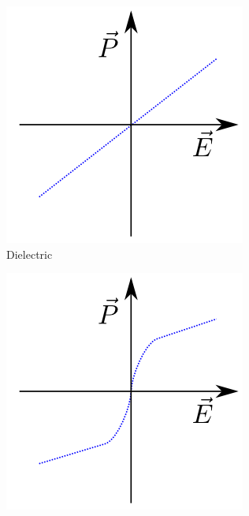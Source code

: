 \begin{figure}
\begin{subfigure}{0.3\textwidth}
\centering
	\includegraphics[width=0.9\linewidth]{./figs/chap1/dielpolplot}
	\caption{Dielectric}
	\label{fig:dielplot}
\end{subfigure}
\begin{subfigure}{0.3\textwidth}
\centering
	\includegraphics[width=0.9\linewidth]{./figs/chap1/parelpolplot}

\end{subfigure}
\end{figure}
